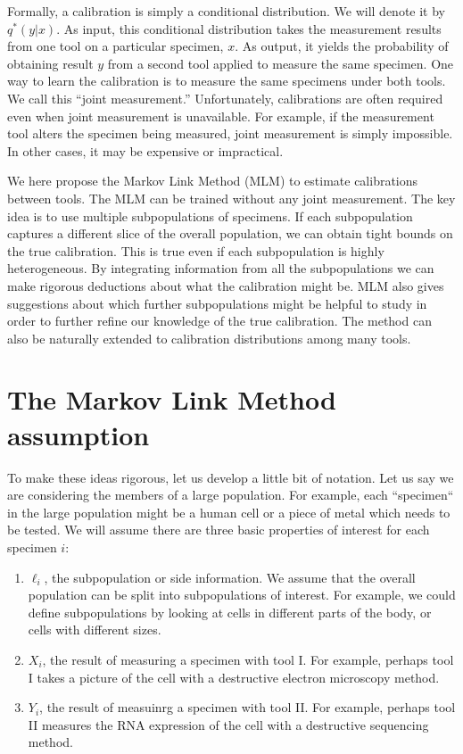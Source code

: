 Formally, a calibration is simply a conditional distribution.  We will denote it by $q^*(y|x)$.  As input, this conditional distribution takes the measurement results from one tool on a particular specimen, $x$.  As output, it yields the probability of obtaining result $y$ from a second tool applied to measure the same specimen.  One way to learn the calibration is to measure the same specimens under both tools.  We call this ``joint measurement.''  Unfortunately, calibrations are often required even when joint measurement is unavailable.  For example, if the measurement tool alters the specimen being measured, joint measurement is simply impossible.  In other cases, it may be expensive or impractical.

We here propose the Markov Link Method (MLM) to estimate calibrations between tools.  The MLM can be trained without any joint measurement.  The key idea is to use multiple subpopulations of specimens.  If each subpopulation captures a different slice of the overall population, we can obtain tight bounds on the true calibration.  This is true even if each subpopulation is highly heterogeneous.  By integrating information from all the subpopulations we can make rigorous deductions about what the calibration might be.  MLM also gives suggestions about which further subpopulations might be helpful to study in order to further refine our knowledge of the true calibration.  The method can also be naturally extended to calibration distributions among many tools.

\section{The Markov Link Method assumption}

To make these ideas rigorous, let us develop a little bit of notation.  Let us say we are considering the members of a large population.  For example, each ``specimen`` in the large population might be a human cell or a piece of metal which needs to be tested.  We will assume there are three basic properties of interest for each specimen $i$:

\begin{enumerate}
\item $\ell_i$, the subpopulation or side information.  We assume that the overall population can be split into subpopulations of interest.  For example, we could define subpopulations by looking at cells in different parts of the body, or cells with different sizes.  
\item $X_i$, the result of measuring a specimen with tool I.  For example, perhaps tool I takes a picture of the cell with a destructive electron microscopy method.
\item $Y_i$, the result of measuinrg a specimen with tool II.  For example, perhaps tool II measures the RNA expression of the cell with a destructive sequencing method.
\end{enumerate}

